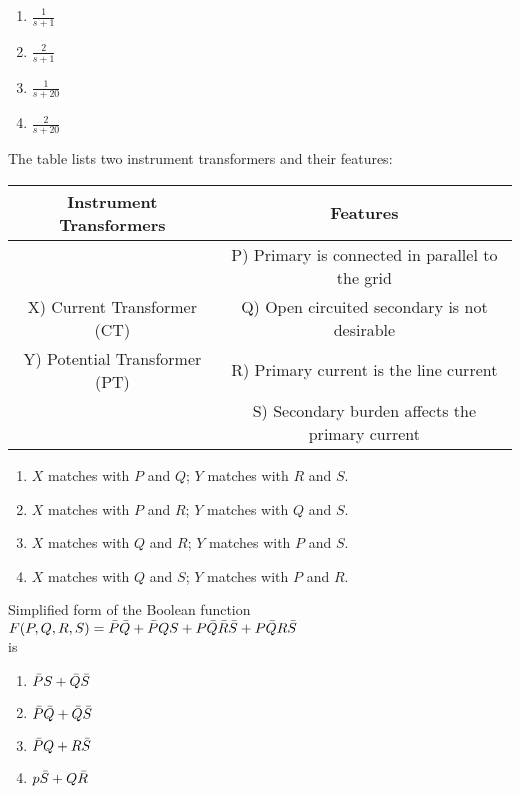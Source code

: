 \begin{enumerate}
    \item $\frac{1}{s+1}$
    \item $\frac{2}{s+1}$
    \item $\frac{1}{s+20}$
    \item $\frac{2}{s+20}$\\
\end{enumerate}
\item The table lists two instrument transformers and their features: 
\begin{table}[h!]
\renewcommand{\thetable}{1}
    \centering
   \begin{tabular}{|c|c|}
        \hline
        \textbf{Instrument Transformers} & \textbf{Features } \\
        
        \hline
          &  P) Primary is connected in parallel to the grid  \\
          \hline
          X) Current Transformer (CT) & Q) Open circuited secondary is not desirable  \\
          \hline
          Y) Potential Transformer (PT)  & R) Primary current is the line current  \\
          \hline
            & S) Secondary burden affects the primary current \\
        \hline
\end{tabular}
\end{table}
\begin{enumerate}
    \item $X$ matches with $P$ and $Q$; $Y$ matches with $R$ and $S$.
    \item $X$ matches with $P$ and $R$; $Y$ matches with $Q$ and $S$.
    \item $X$ matches with $Q$ and $R$; $Y$ matches with $P$ and $S$.
    \item $X$ matches with $Q$ and $S$; $Y$ matches with $P$ and $R$. \\
\end{enumerate}
\item Simplified form of the Boolean function \\ $F(P,Q,R,S)=\Bar{P}\Bar{Q}+\Bar{P}QS+P\Bar{Q}\Bar{R}\Bar{S}+P\Bar{Q}R\Bar{S}$ \\is 
\begin{enumerate}
    \item $\Bar{P}S+\Bar{Q}\Bar{S}$
    \item $\Bar{P}\Bar{Q}+\Bar{Q}\Bar{S}$
    \item $\Bar{P}Q+R\Bar{S}$
    \item $p\Bar{S}+Q\Bar{R}$\\
\end{enumerate}
